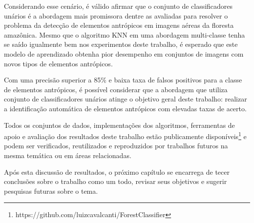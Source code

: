 Considerando esse cenário, é válido afirmar que o conjunto de classificadores unários é a abordagem mais promissora dentre as avaliadas para resolver o problema da detecção de elementos antrópicos em imagens aéreas da floresta amazônica. Mesmo que o algoritmo KNN em uma abordagem multi-classe tenha se saído igualmente bem nos experimentos deste trabalho, é esperado que este modelo de aprendizado obtenha pior desempenho em conjuntos de imagens com novos tipos de elementos antrópicos.

Com uma precisão superior a 85\% e baixa taxa de falsos positivos para a classe de elementos antrópicos, é possível considerar que a abordagem que utiliza conjunto de classificadores unários atinge o objetivo geral deste trabalho: realizar a identificação automática de elementos antrópicos com elevadas taxas de acerto.

Todos os conjuntos de dados, implementações dos algoritmos, ferramentas de apoio e avaliação dos resultados deste trabalho estão publicamente disponíveis\footnote{https://github.com/luizcavalcanti/ForestClassifier} e podem ser verificados, reutilizados e reproduzidos por trabalhos futuros na mesma temática ou em áreas relacionadas.

Após esta discussão de resultados, o próximo capítulo se encarrega de tecer conclusões sobre o trabalho como um todo, revisar seus objetivos e sugerir pesquisas futuras sobre o tema.